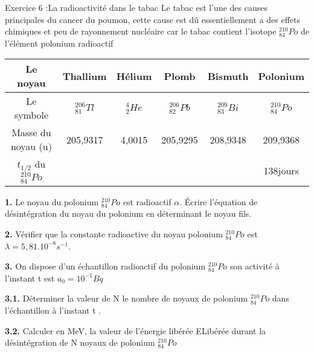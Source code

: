 \documentclass[12pt, french]{article}
\begin{document}
\begin{Box2}{Exercice 6 :La radioactivité dans le tabac}
Le tabac est l’une des causes principales du cancer du poumon, cette cause est dû essentiellement a
des effets chimiques et peu de rayonnement nucléaire car le tabac contient l’isotope $^{210}_{84}Po$ de l’élément polonium radioactif	

\begin{center}
\begin{tabular}{ |c|c|c|c|c|c| }
	\hline
 Le noyau  & Thallium        & Hélium       & Plomb & Bismuth & Polonium\\\hline 
 Le symbole & $^{206}_{81}Tl$ & $^{4}_{2}He$& $^{206}_{82}Pb$ & $^{209}_{83}Bi$&$^{210}_{84}Po$\\\hline
Masse du noyau (u)& 205,9317 & 4,0015 & 205,9295 &208,9348 & 209,9368\\\hline
$t_{1/2}$ du $^{210}_{84}Po$ & & & & & 138jours\\\hline

\end{tabular}
\end{center}
\textbf{1. }Le noyau du polonium $^{210}_{84}Po$ est radioactif $\alpha$. Écrire l’équation de désintégration du noyau du
polonium en déterminant le noyau fils.

\textbf{2. }Vérifier que la constante radioactive du noyau polonium $^{210}_{84}Po$ est $\lambda = 5,81.10^{-8}s^{-1}$.

\textbf{3. }On dispose d’un échantillon radioactif du polonium $^{210}_{84}Po$ son activité à l’instant t est $a_0 = 10^{-1} Bq$

\textbf{3.1. }Déterminer la valeur de N le nombre de noyaux de polonium $^{210}_{84}Po$ dans l’échantillon à l’instant t .

\textbf{3.2. }Calculer en MeV, la valeur de l’énergie libérée ELibérée durant la désintégration de N noyaux de polonium $^{210}_{84}Po$


\end{Box2}
\end{document}
